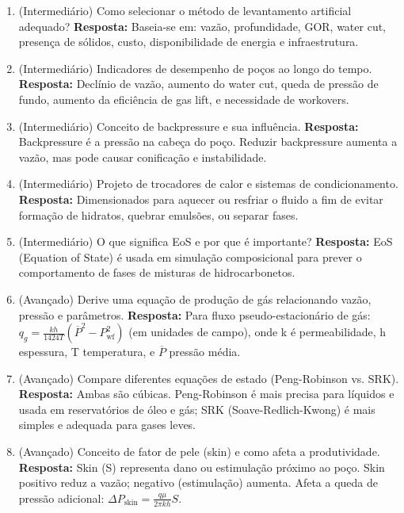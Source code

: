 \documentclass[11pt,a4paper]{article}
\begin{document}
\begin{enumerate}
  \item (Intermediário) Como selecionar o método de levantamento artificial adequado?
  \textbf{Resposta:} Baseia-se em: vazão, profundidade, GOR, water cut, presença de sólidos, custo, disponibilidade de energia e infraestrutura.

  \item (Intermediário) Indicadores de desempenho de poços ao longo do tempo.
  \textbf{Resposta:} Declínio de vazão, aumento do water cut, queda de pressão de fundo, aumento da eficiência de gas lift, e necessidade de workovers.

  \item (Intermediário) Conceito de backpressure e sua influência.
  \textbf{Resposta:} Backpressure é a pressão na cabeça do poço. Reduzir backpressure aumenta a vazão, mas pode causar conificação e instabilidade.

  \item (Intermediário) Projeto de trocadores de calor e sistemas de condicionamento.
  \textbf{Resposta:} Dimensionados para aquecer ou resfriar o fluido a fim de evitar formação de hidratos, quebrar emulsões, ou separar fases.

  \item (Intermediário) O que significa EoS e por que é importante?
  \textbf{Resposta:} EoS (Equation of State) é usada em simulação composicional para prever o comportamento de fases de misturas de hidrocarbonetos.

  \item (Avançado) Derive uma equação de produção de gás relacionando vazão, pressão e parâmetros.
  \textbf{Resposta:} Para fluxo pseudo-estacionário de gás: $q_g = \frac{kh}{1424 T} \left( \overline{P}^2 - P_{\text{wf}}^2 \right)$ (em unidades de campo), onde k é permeabilidade, h espessura, T temperatura, e $\overline{P}$ pressão média.

  \item (Avançado) Compare diferentes equações de estado (Peng-Robinson vs. SRK).
  \textbf{Resposta:} Ambas são cúbicas. Peng-Robinson é mais precisa para líquidos e usada em reservatórios de óleo e gás; SRK (Soave-Redlich-Kwong) é mais simples e adequada para gases leves.

  \item (Avançado) Conceito de fator de pele (skin) e como afeta a produtividade.
  \textbf{Resposta:} Skin (S) representa dano ou estimulação próximo ao poço. Skin positivo reduz a vazão; negativo (estimulação) aumenta. Afeta a queda de pressão adicional: $\Delta P_{\text{skin}} = \frac{q\mu}{2\pi kh} S$.


\end{enumerate}
\end{document}
